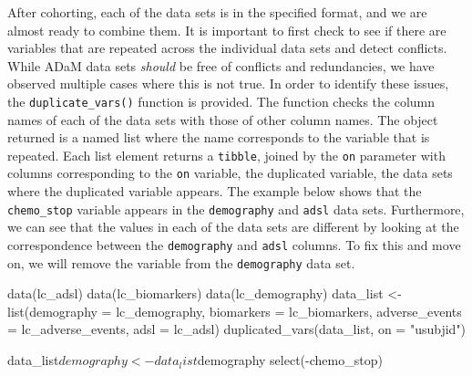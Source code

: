 After cohorting, each of the data sets is in the specified format, and
we are almost ready to combine them. It is important to first check to
see if there are variables that are repeated across the individual data
sets and detect conflicts. While ADaM data sets \emph{should} be free of
conflicts and redundancies, we have observed multiple cases where this
is not true. In order to identify these issues, the
\texttt{duplicate\_vars()} function is provided. The function checks the
column names of each of the data sets with those of other column names.
The object returned is a named list where the name corresponds to the
variable that is repeated. Each list element returns a \texttt{tibble},
joined by the \texttt{on} parameter with columns corresponding to the
\texttt{on} variable, the duplicated variable, the data sets where the
duplicated variable appears. The example below shows that the
\texttt{chemo\_stop} variable appears in the \texttt{demography} and
\texttt{adsl} data sets. Furthermore, we can see that the values in each
of the data sets are different by looking at the correspondence between
the \texttt{demography} and \texttt{adsl} columns. To fix this and move
on, we will remove the variable from the \texttt{demography} data set.

\begin{Schunk}
\begin{Sinput}
data(lc_adsl)
data(lc_biomarkers)
data(lc_demography)
data_list <- list(demography = lc_demography, 
                  biomarkers = lc_biomarkers, 
                  adverse_events = lc_adverse_events, 
                  adsl = lc_adsl)
duplicated_vars(data_list, on = "usubjid")
\end{Sinput}
\begin{Sinput}
data_list$demography <- data_list$demography %>% 
  select(-chemo_stop)
\end{Sinput}
\end{Schunk}


